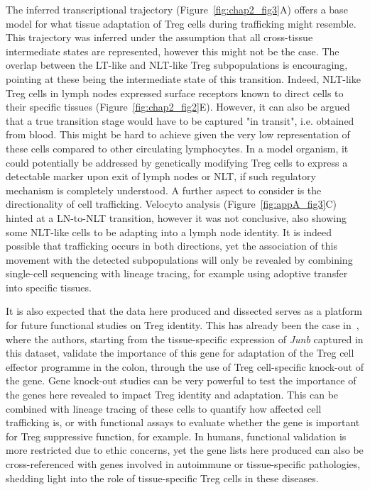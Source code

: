 The inferred transcriptional trajectory (Figure~\ref{fig:chap2_fig3}A) offers a base model for what tissue adaptation of Treg cells during trafficking might resemble. This trajectory was inferred under the assumption that all cross-tissue intermediate states are represented, however this might not be the case. The overlap between the LT-like and NLT-like Treg subpopulations is encouraging, pointing at these being the intermediate state of this transition. Indeed, NLT-like Treg cells in lymph nodes expressed surface receptors known to direct cells to their specific tissues (Figure~\ref{fig:chap2_fig2}E). However, it can also be argued that a true transition stage would have to be captured "in transit", i.e. obtained from blood. This might be hard to achieve given the very low representation of these cells compared to other circulating lymphocytes. In a model organism, it could potentially be addressed by genetically modifying Treg cells to express a detectable marker upon exit of lymph nodes or NLT, if such regulatory mechanism is completely understood. A further aspect to consider is the directionality of cell trafficking. Velocyto analysis (Figure~\ref{fig:appA_fig3}C) hinted at a LN-to-NLT transition, however it was not conclusive, also showing some NLT-like cells to be adapting into a lymph node identity. It is indeed possible that trafficking occurs in both directions, yet the association of this movement with the detected subpopulations will only be revealed by combining single-cell sequencing with lineage tracing, for example using adoptive transfer into specific tissues.

It is also expected that the data here produced and dissected serves as a platform for future functional studies on Treg identity. This has already been the case in~\citep{wheaton_junb_2019}, where the authors, starting from the tissue-specific expression of \textit{Junb} captured in this dataset, validate the importance of this gene for adaptation of the Treg cell effector programme in the colon, through the use of Treg cell-specific knock-out of the gene. Gene knock-out studies can be very powerful to test the importance of the genes here revealed to impact Treg identity and adaptation. This can be combined with lineage tracing of these cells to quantify how affected cell trafficking is, or with functional assays to evaluate whether the gene is important for Treg suppressive function, for example. In humans, functional validation is more restricted due to ethic concerns, yet the gene lists here produced can also be cross-referenced with genes involved in autoimmune or tissue-specific pathologies, shedding light into the role of tissue-specific Treg cells in these diseases.

